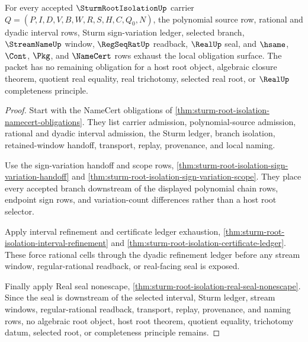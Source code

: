 \begin{theorem}
\label{thm:sturm-root-isolation-obligation-closure-route}
For every accepted $\SturmRootIsolationUp$ carrier $Q=(P,I,D,V,B,W,R,S,H,C,Q_0,N)$, the polynomial source row, rational and dyadic interval rows, Sturm sign-variation ledger, selected branch, $\StreamNameUp$ window, $\RegSeqRatUp$ readback, $\RealUp$ seal, and $\hsame$, $\Cont$, $\Pkg$, and $\NameCert$ rows exhaust the local obligation surface. The packet has no remaining obligation for a host root object, algebraic closure theorem, quotient real equality, real trichotomy, selected real root, or $\RealUp$ completeness principle.
\end{theorem}
\begin{proof}
Start with the NameCert obligations of \autoref{thm:sturm-root-isolation-namecert-obligations}. They list carrier admission, polynomial-source admission, rational and dyadic interval admission, the Sturm ledger, branch isolation, retained-window handoff, transport, replay, provenance, and local naming.

Use the sign-variation handoff and scope rows, \autoref{thm:sturm-root-isolation-sign-variation-handoff} and \autoref{thm:sturm-root-isolation-sign-variation-scope}. They place every accepted branch downstream of the displayed polynomial chain rows, endpoint sign rows, and variation-count differences rather than a host root selector.

Apply interval refinement and certificate ledger exhaustion, \autoref{thm:sturm-root-isolation-interval-refinement} and \autoref{thm:sturm-root-isolation-certificate-ledger}. These force rational cells through the dyadic refinement ledger before any stream window, regular-rational readback, or real-facing seal is exposed.

Finally apply Real seal nonescape, \autoref{thm:sturm-root-isolation-real-seal-nonescape}. Since the seal is downstream of the selected interval, Sturm ledger, stream windows, regular-rational readback, transport, replay, provenance, and naming rows, no algebraic root object, host root theorem, quotient equality, trichotomy datum, selected root, or completeness principle remains.
\end{proof}

